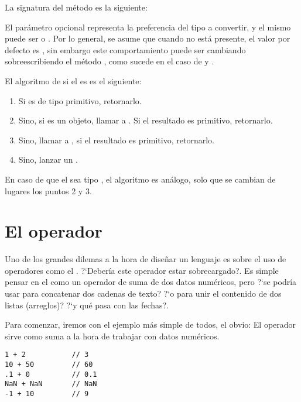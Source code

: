 La signatura del método es la siguiente: 

El parámetro opcional  representa la preferencia del tipo a convertir, y el mismo puede ser  o . Por lo general, se asume que cuando no está presente, el valor por defecto es , sin embargo este comportamiento puede ser cambiando sobreescribiendo el método , como sucede en el caso de  y .

El algoritmo de  si el  es  es el siguiente:

\begin{enumerate}
\item Si  es de tipo primitivo, retornarlo.
\item Sino, si  es un objeto, llamar a . Si el resultado es primitivo, retornarlo.
\item Sino, llamar a , si el resultado es primitivo, retornarlo.
\item Sino, lanzar un .
\end{enumerate}

En caso de que el  sea tipo , el algoritmo es análogo, solo que se cambian de lugares los puntos 2 y 3.

\section{El operador \code{+}}
\label{sec:operadormas}

Uno de los grandes dilemas a la hora de diseñar un lenguaje es sobre el uso de operadores como el \code{+}. ?`Debería este operador estar sobrecargado?. Es simple pensar en el \code{+} como un operador de suma de dos datos numéricos, pero ?`se podría usar para concatenar dos cadenas de texto? ?`o para unir el contenido de dos listas (arreglos)? ?`y qué pasa con las fechas?. 

Para comenzar, iremos con el ejemplo más simple de todos, el obvio: El operador \code{+} sirve como suma a la hora de trabajar con datos numéricos.

\begin{lstlisting}[title={Operador \code{+} en números}]
1 + 2 			// 3
10 + 50 		// 60
.1 + 0			// 0.1
NaN + NaN		// NaN
-1 + 10			// 9
\end{lstlisting}

